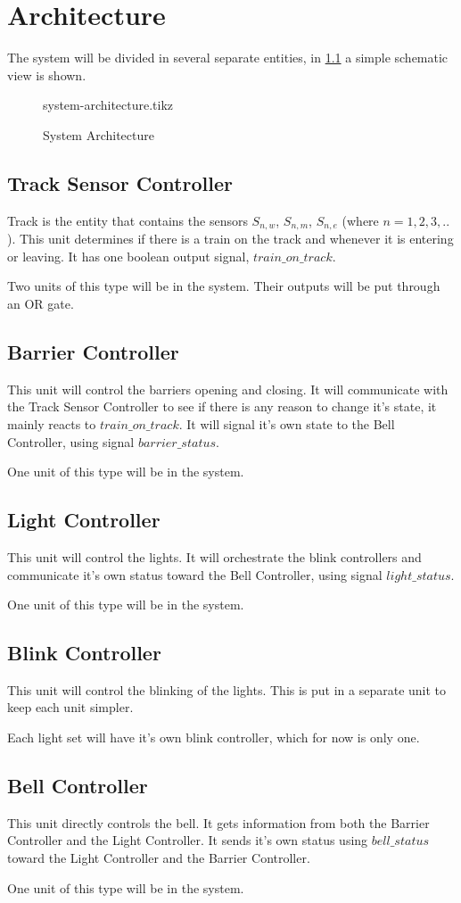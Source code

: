 \documentclass[final]{report}
\begin{document}
\chapter{Architecture}
The system will be divided in several separate entities, in \cref{fig:system-architecture} a simple schematic view is shown.

\begin{figure}[H]
	\centering
	{system-architecture.tikz}
	\caption{System Architecture}
	\label{fig:system-architecture}
\end{figure}

\section{Track Sensor Controller}
Track is the entity that contains the sensors $S_{n,w}$, $S_{n,m}$, $S_{n,e}$ (where $n = 1,2,3,..$).
This unit determines if there is a train on the track and whenever it is entering or leaving.
It has one boolean output signal, $train\_on\_track$.

Two units of this type will be in the system.
Their outputs will be put through an OR gate.
\section{Barrier Controller}
This unit will control the barriers opening and closing.
It will communicate with the Track Sensor Controller to see if there is any reason to change it's state, it mainly reacts to $train\_on\_track$.
It will signal it's own state to the Bell Controller, using signal $barrier\_status$.

One unit of this type will be in the system.
\section{Light Controller}
This unit will control the lights.
It will orchestrate the blink controllers and communicate it's own status toward the Bell Controller, using signal $light\_status$.

One unit of this type will be in the system.
\section{Blink Controller}
This unit will control the blinking of the lights.
This is put in a separate unit to keep each unit simpler.

Each light set will have it's own blink controller, which for now is only one.
\section{Bell Controller}
This unit directly controls the bell.
It gets information from both the Barrier Controller and the Light Controller.
It sends it's own status using $bell\_status$ toward the Light Controller and the Barrier Controller.

One unit of this type will be in the system.
\end{document}
